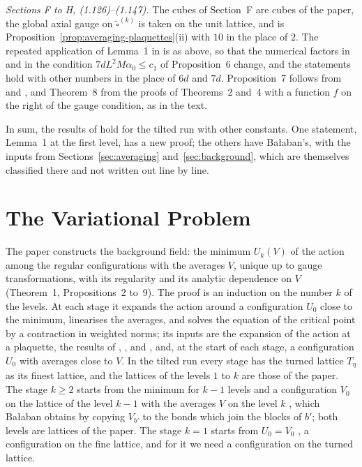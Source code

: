 \documentclass[11pt]{preprint}
\numberwithin{equation}{section}
\theoremstyle{definition}
\theoremstyle{remark}
\theoremstyle{plain}
\begin{document}
\emph{Sections F to H, (1.126)--(1.147).} The cubes of Section~F are cubes of the paper, the global axial gauge on $\tilde\square^{(k)}$ \cite[(1.129)]{BalabanREG} is taken on the unit lattice, and \cite[(1.128)]{BalabanREG} is Proposition~\ref{prop:averaging-plaquettes}(ii) with $10$ in the place of $2$. The repeated application of Lemma~1 in \cite[(1.130)]{BalabanREG} is as above, so that the numerical factors in \cite[(1.130), (1.133), (1.134), (1.136)]{BalabanREG} and in the condition $7dL^2M\alpha_0 \leq c_1$ of Proposition~6 change, and the statements hold with other numbers in the place of $6d$ and $7d$. Proposition~7 follows from \cite[(1.21), (1.47), (1.54)]{BalabanREG} and \cite[Proposition~4]{BalabanAVG}, and Theorem~8 from the proofs of Theorems~2 and~4 with a function $f$ on the right of the gauge condition, as in the text.

In sum, the results of \cite{BalabanREG} hold for the tilted run with other constants. One statement, Lemma~1 at the first level, has a new proof; the others have Ba{\l}aban's, with the inputs from Sections~\ref{sec:averaging} and~\ref{sec:background}, which are themselves classified there and not written out line by line.

\section{The Variational Problem}\label{sec:variational}

The paper \cite{BalabanVAR} constructs the background field: the minimum $U_k(V)$ of the action among the regular configurations with the averages $V$, unique up to gauge transformations, with its regularity and its analytic dependence on $V$ (Theorem~1, Propositions~2 to~9). The proof is an induction on the number $k$ of the levels. At each stage it expands the action around a configuration $U_0$ close to the minimum, linearises the averages, and solves the equation of the critical point by a contraction in weighted norms; its inputs are the expansion of the action at a plaquette, the results of \cite{BalabanAVG}, \cite{BalabanPBG}, and \cite{BalabanREG}, and, at the start of each stage, a configuration $U_0$ with averages close to $V$. In the tilted run every stage has the turned lattice $T_\eta$ as its finest lattice, and the lattices of the levels $1$ to $k$ are those of the paper. The stage $k \geq 2$ starts from the minimum for $k - 1$ levels and a configuration $V_0$ on the lattice of the level $k - 1$ with the averages $V$ on the level $k$ \cite[(11), p.~279]{BalabanVAR}, which Ba{\l}aban obtains by copying $V_{b'}$ to the bonds which join the blocks of $b'$; both levels are lattices of the paper. The stage $k = 1$ starts from $U_0 = V_0$ \cite[p.~280]{BalabanVAR}, a configuration on the fine lattice, and for it we need a configuration on the turned lattice.
\end{document}
